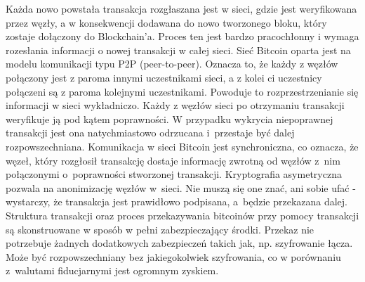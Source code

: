 \documentclass[12pt, twoside, final, openany]{mgr}
\begin{document}
\indent Każda nowo powstała transakcja rozgłaszana jest w sieci, gdzie jest weryfikowana przez węzły, a w konsekwencji dodawana do nowo tworzonego bloku, który zostaje dołączony do Blockchain'a. Proces ten jest bardzo pracochłonny i wymaga rozesłania informacji o nowej transakcji w całej sieci. Sieć Bitcoin oparta jest na modelu komunikacji typu P2P (peer-to-peer). Oznacza to, że każdy z węzłów połączony jest z paroma innymi uczestnikami sieci, a z kolei ci uczestnicy połączeni są z paroma kolejnymi uczestnikami. Powoduje to rozprzestrzenianie się informacji w sieci wykładniczo. Każdy z węzłów sieci po otrzymaniu transakcji weryfikuje ją pod kątem poprawności. W przypadku wykrycia niepoprawnej transakcji jest ona natychmiastowo odrzucana i~przestaje być dalej rozpowszechniana. Komunikacja w sieci Bitcoin jest synchroniczna, co oznacza, że węzeł, który rozgłosił transakcję dostaje informację zwrotną od węzłów z~nim połączonymi o~poprawności stworzonej transakcji. Kryptografia asymetryczna pozwala na anonimizację węzłów w~sieci. Nie muszą się one znać, ani sobie ufać - wystarczy, że transakcja jest prawidłowo podpisana, a~będzie przekazana dalej. Struktura transakcji oraz proces przekazywania bitcoinów przy pomocy transakcji są skonstruowane w sposób w pełni zabezpieczający środki. Przekaz nie potrzebuje żadnych dodatkowych zabezpieczeń takich jak, np. szyfrowanie łącza. Może być rozpowszechniany bez jakiegokolwiek szyfrowania, co w porównaniu z~walutami fiducjarnymi jest ogromnym zyskiem\cite{Mastering}.
\end{document}
